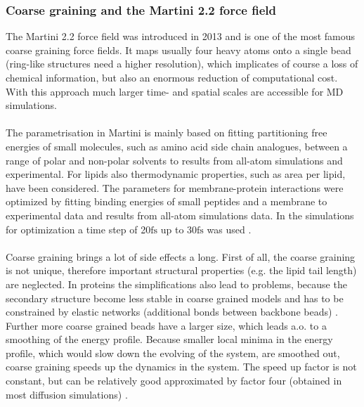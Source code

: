 \subsubsection{Coarse graining and the Martini 2.2 force field}
\label{subsub:coarsegraining}
The Martini 2.2 \autocites{martini22_lipids}{martini22} force field was introduced in 2013 and is one of the most famous coarse graining force fields. It maps usually four heavy atoms onto a single bead (ring-like structures need a higher resolution), which implicates of course a loss of chemical information, but also an enormous reduction of computational cost. With this approach much larger time- and spatial scales are accessible for MD simulations.\\
\\
The parametrisation in Martini is mainly based on fitting partitioning free energies of small molecules, such as amino acid side chain analogues, between a range of polar and non-polar solvents to results from all-atom simulations and experimental. For lipids also thermodynamic properties, such as area per lipid, have been considered. The parameters for membrane-protein interactions were optimized by fitting binding energies of small peptides and a membrane to experimental data and results from all-atom simulations data. In the simulations for optimization a time step of 20$\si{\femto\second}$ up to 30$\si{\femto\second}$ was used \autocites{martini22}{martini22_lipids}.\\
\\
Coarse graining brings a lot of side effects a long. First of all, the coarse graining is not unique, therefore important structural properties (e.g. the lipid tail length) are neglected. In proteins the simplifications also lead to problems, because the secondary structure become less stable in coarse grained models and has to be constrained by elastic networks (additional bonds between backbone beads) \autocite[p. 6812]{martini22_check}.\\
Further more coarse grained beads have a larger size, which leads a.o. to a smoothing of the energy profile. Because smaller local minima in the energy profile, which would slow down the evolving of the system, are smoothed out, coarse graining speeds up the dynamics in the system. The speed up factor is not constant, but can be relatively good approximated by factor four (obtained in most diffusion simulations) \autocites[p. 6810]{martini22_check}[p. 7815]{martini}.\\
\\

